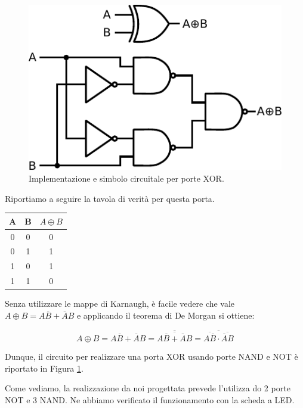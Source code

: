 \begin{figure}
\centering
\includegraphics[width=.330\textwidth]{../E09/latex/XOR.pdf}
\caption{Implementazione e simbolo circuitale per porte XOR.}
\label{cir9:XOR}
\end{figure}

Riportiamo a seguire la tavola di verità per questa porta.

\begin{table}[htpc]
\begin{minipage}{0.6\textwidth}
\centering
{\renewcommand{\arraystretch}{1.1}%
\begin{tabular}{|c|c|c|}
\hline
A & B & $A \oplus B$ \\
\hline
0 & 0 & 0\\
\hline
0 & 1 & 1\\
\hline
1 & 0 & 1\\
\hline
1 & 1 & 0\\
\hline
\end{tabular}}
\label{tab9:XOR}
\end{minipage}
\end{table}

Senza utilizzare le mappe di Karnaugh, è facile vedere che vale $A \oplus B=A\overline B + \overline A B$ e applicando il teorema di De Morgan si ottiene:  %

$$A \oplus B=A\overline B + \overline A B=\overline{\overline{A\overline B + \overline A B}}=\overline{\overline{A\overline B} \cdot \overline{\overline A B}}$$

Dunque, il circuito per realizzare una porta XOR usando porte NAND e NOT è riportato in Figura \ref{cir9:XOR}.

Come vediamo, la realizzazione da noi progettata prevede l'utilizza do 2 porte NOT e 3 NAND.
Ne abbiamo verificato il funzionamento con la scheda a LED.

\newpage

